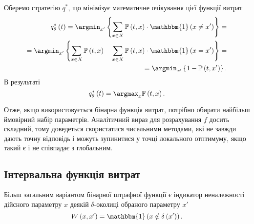 Оберемо стратегію $q^*$,
що мінімізує математичне очікування цієї функції витрат
\begin{equation*}
  \begin{split}
    q^*_{\theta}\left( t \right)
    = \argmin_{x'} \left\{
      \sum\limits_{x \in X}
        \mathbb{P}\left( t, x \right)
        \cdot \mathbbm{1} \left( x \neq x' \right)
      \right\} = \\
    = \argmin_{x'} \left\{
      \sum\limits_{x \in X}
        \mathbb{P}\left( t, x \right)
      - \sum\limits_{x \in X}
        \mathbb{P}\left( t, x \right)
        \cdot \mathbbm{1} \left( x = x' \right)
      \right\} = \\
    = \argmin_{x'} \left\{
      1 - \mathbb{P}\left( t, x' \right)
      \right\}.
  \end{split}
\end{equation*}
В результаті
\begin{equation*}
  q^*_{\theta}\left( t \right)
  = \argmax_x \mathbb{P} \left( t, x \right).
\end{equation*}

Отже, якщо використовується бінарна функція витрат,
потрібно обирати найбільш ймовірний набір параметрів.
Аналітичний вираз для розрахування $f$ досить складний,
тому доведеться скористатися чисельними методами,
які не завжди дають точну відповідь
і можуть зупинитися у точці локального отптимуму, якщо такий є
і не співпадає з глобальним.

\subsection{Інтервальна функція витрат}

Більш загальним варіантом бінарної штрафної функції є
індикатор неналежності дійсного параметру $x$
деякій $\delta$-околиці обраного параметру $x'$
\begin{equation*}
  W \left( x, x' \right)
  = \mathbbm{1} \left( x \notin \delta\left( x' \right) \right).
\end{equation*}

